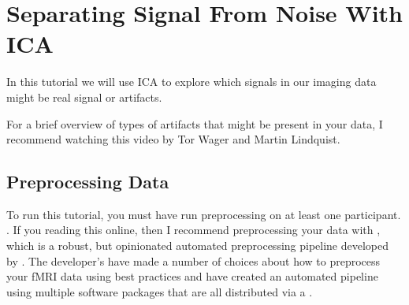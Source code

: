 \documentclass[letterpaper,10pt,english]{sphinxmanual}
\begin{document}
\section{Separating Signal From Noise With ICA}
\label{\detokenize{content/ICA:separating-signal-from-noise-with-ica}}\label{\detokenize{content/ICA::doc}}

In this tutorial we will use ICA to explore which signals in our imaging data might be real signal or artifacts.

For a brief overview of types of artifacts that might be present in your data, I recommend watching this video by Tor Wager and Martin Lindquist.

\begin{sphinxVerbatim}[commandchars=\\\{\}]
   

\end{sphinxVerbatim}

\noindent{}


\subsection{Preprocessing Data}
\label{\detokenize{content/ICA:preprocessing-data}}
To run this tutorial, you must have run preprocessing on at least one participant. . If you reading this online, then I recommend preprocessing your data with , which is a robust, but opinionated automated preprocessing pipeline developed by . The developer’s have made a number of choices about how to preprocess your fMRI data using best practices and have created an automated pipeline using multiple software packages that are all distributed via a .
\end{document}
